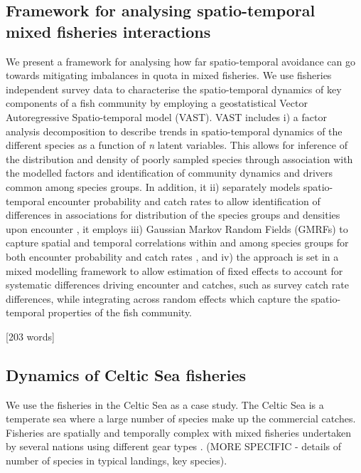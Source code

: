 \documentclass{nature}
\begin{document}
\begin{linenumbers}
[577 words]

\subsection{Framework for analysing spatio-temporal mixed fisheries
	interactions}

We present a framework for analysing how far spatio-temporal avoidance can go
towards mitigating imbalances in quota in mixed fisheries. We use fisheries
independent survey data to characterise the spatio-temporal dynamics of key
components of a fish community by employing a geostatistical Vector
Autoregressive Spatio-temporal model (VAST). VAST includes i) a factor analysis
decomposition to describe trends in spatio-temporal dynamics of the different
species as a function of \textit{n} latent variables\cite{Thorson2015}. This
allows for inference of the distribution and density of poorly sampled species
through association with the modelled factors and identification of community
dynamics and drivers common among species groups. In addition, it ii)
separately models spatio-temporal encounter probability and catch rates to
allow identification of differences in associations for distribution of the
species groups and densities upon encounter \cite{Thorson2015a}, it employs iii)
Gaussian Markov Random Fields (GMRFs) to capture spatial and temporal
correlations within and among species groups for both encounter probability and
catch rates \cite{Thorson2013}, and iv) the approach is set in a mixed
modelling framework to allow estimation of fixed effects to account for
systematic differences driving encounter and catches, such as survey catch rate
differences, while integrating across random effects which capture the
spatio-temporal properties of the fish community.

[203 words]

\subsection{Dynamics of Celtic Sea fisheries}

We use the fisheries in the Celtic Sea as a case study. The Celtic Sea is a
temperate sea where a large number of species make up the commercial catches.
Fisheries are spatially and temporally complex with mixed fisheries undertaken
by several nations using different gear types \cite{Ellis2000, Gerritsen2012}.
(MORE SPECIFIC - details of number of species in typical landings, key
species).


\end{linenumbers}
\end{document}
